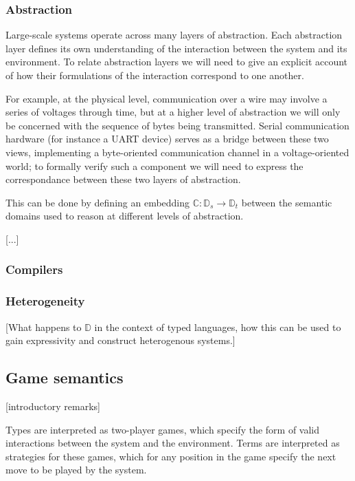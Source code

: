 \documentclass[acmsmall,timestamp,review]{acmart}
\begin{document}
\subsubsection{Abstraction}

Large-scale systems operate across many layers of abstraction.
Each abstraction layer defines its own understanding of the interaction
between the system and its environment.
To relate abstraction layers we will need to give an explicit account
of how their formulations of the interaction correspond to one another.

For example,
at the physical level,
communication over a wire may involve a series of voltages through time,
but at a higher level of abstraction
we will only be concerned with the sequence of bytes
being transmitted.
Serial communication hardware (for instance a UART device)
serves as a bridge between these two views,
implementing a byte-oriented communication channel
in a voltage-oriented world;
to formally verify such a component we will need to
express the correspondance between these two
layers of abstraction.

This can be done by defining an embedding
$\mathbb{C} : \mathbb{D}_s \rightarrow \mathbb{D}_t$
between the semantic domains
used to reason at different levels of abstraction.

[...]

\subsubsection{Compilers}


\subsubsection{Heterogeneity}

[What happens to $\mathbb{D}$ in the context of typed languages,
how this can be used to gain expressivity and construct heterogenous systems.]


\subsection{Game semantics}

[introductory remarks]

Types are interpreted as two-player games,
which specify the form of valid interactions
between the system and the environment.
Terms are interpreted as strategies for these games,
which for any position in the game
specify the next move to be played by the system.
\end{document}
